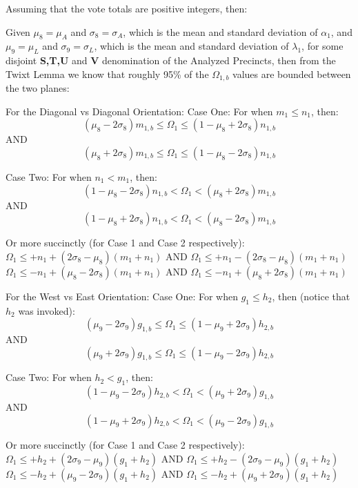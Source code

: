 \begin{corollary}
Assuming that the vote totals are positive integers, then:

Given $\mu_{8}=\mu_{A}$ and $\sigma_{8}=\sigma_{A}$, which is the mean and standard deviation of $\alpha_{1}$, and $\mu_{9}=\mu_{L}$ and $\sigma_{9}=\sigma_{L}$, which is the mean and standard deviation of $\lambda_{1}$, for some disjoint \textbf{S,T,U} and \textbf{V} denomination of the Analyzed Precincts, then from the Twixt Lemma we know that roughly 95\% of the $\Omega_{1,b}$ values are bounded between the two planes:

For the Diagonal vs Diagonal Orientation:
Case One:  For when $m_{1} \le n_{1}$, then:
$$(\mu_{8}-2\sigma_{8})m_{1,b} \le \Omega_{1} \le (1-\mu_{8}+2\sigma_{8})n_{1,b}$$
AND
$$(\mu_{8}+2\sigma_{8})m_{1,b} \le \Omega_{1} \le (1-\mu_{8}-2\sigma_{8})n_{1,b}$$

Case Two: For when $n_{1} < m_{1}$, then:
$$(1-\mu_{8}-2\sigma_{8})n_{1,b} < \Omega_{1} < (\mu_{8}+2\sigma_{8})m_{1,b}$$
AND
$$(1-\mu_{8}+2\sigma_{8})n_{1,b} < \Omega_{1} < (\mu_{8}-2\sigma_{8})m_{1,b}$$

Or more succinctly (for Case 1 and Case 2 respectively):\\
$\Omega_{1} \le +n_{1}+(2\sigma_{8}-\mu_{8})(m_{1}+n_{1})$ AND $\Omega_{1} \le +n_{1}-(2\sigma_{8}-\mu_{8})(m_{1}+n_{1})$\\
$\Omega_{1} \le -n_{1}+(\mu_{8}-2\sigma_{8})(m_{1}+n_{1})$ AND $\Omega_{1} \le -n_{1}+(\mu_{8}+2\sigma_{8})(m_{1}+n_{1})$

For the West vs East Orientation:
Case One:  For when $g_{1} \le h_{2}$, then (notice that $h_{2}$ was invoked):
$$(\mu_{9}-2\sigma_{9})g_{1,b} \le \Omega_{1} \le (1-\mu_{9}+2\sigma_{9})h_{2,b}$$
AND
$$(\mu_{9}+2\sigma_{9})g_{1,b} \le \Omega_{1} \le (1-\mu_{9}-2\sigma_{9})h_{2,b}$$

Case Two: For when $h_{2} < g_{1}$, then:
$$(1-\mu_{9}-2\sigma_{9})h_{2,b} < \Omega_{1} < (\mu_{9}+2\sigma_{9})g_{1,b}$$
AND
$$(1-\mu_{9}+2\sigma_{9})h_{2,b} < \Omega_{1} < (\mu_{9}-2\sigma_{9})g_{1,b}$$

Or more succinctly (for Case 1 and Case 2 respectively):\\
$\Omega_{1} \le +h_{2}+(2\sigma_{9}-\mu_{9})(g_{1}+h_{2})$ AND $\Omega_{1} \le +h_{2}-(2\sigma_{9}-\mu_{9})(g_{1}+h_{2})$\\
$\Omega_{1} \le -h_{2}+(\mu_{9}-2\sigma_{9})(g_{1}+h_{2})$ AND $\Omega_{1} \le -h_{2}+(\mu_{9}+2\sigma_{9})(g_{1}+h_{2})$
\end{corollary}
